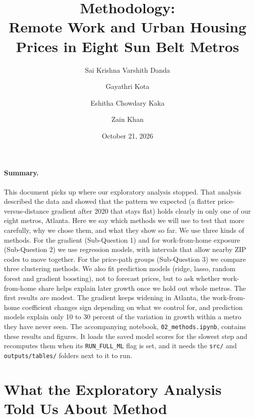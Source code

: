 \documentclass[11pt]{article}
\title{Methodology:\\ Remote Work and Urban Housing Prices in Eight Sun Belt Metros}
\author[1]{Sai Krishna Varshith Danda}
\author[1]{Gayathri Kota}
\author[1]{Eshitha Chowdary Kaka}
\author[1]{Zain Khan}
\affil[1]{Arizona State University, Tempe, AZ 85281, USA}
\date{October 21, 2026}
\begin{document}
\maketitle

\paragraph{Summary.} This document picks up where our exploratory analysis stopped. That analysis described the data and
showed that the pattern we expected (a flatter price-versus-distance gradient after 2020 that stays flat) holds clearly in only
one of our eight metros, Atlanta. Here we say which methods we will use to test that more carefully, why we chose them, and what
they show so far. We use three kinds of methods. For the gradient (Sub-Question 1) and for work-from-home exposure
(Sub-Question 2) we use regression models, with intervals that allow nearby ZIP codes to move together. For the price-path groups
(Sub-Question 3) we compare three clustering methods. We also fit prediction models (ridge, lasso, random forest and gradient
boosting), not to forecast prices, but to ask whether work-from-home share helps explain later growth once we hold out whole
metros. The first results are modest. The gradient keeps widening in Atlanta, the work-from-home coefficient changes sign
depending on what we control for, and prediction models explain only 10 to 30 percent of the variation in growth within a metro
they have never seen. The accompanying notebook, \texttt{02\_methods.ipynb}, contains these results and figures. It loads the saved model scores for the
slowest step and recomputes them when its \texttt{RUN\_FULL\_ML} flag is set, and it needs the \texttt{src/} and
\texttt{outputs/tables/} folders next to it to run.

\section{What the Exploratory Analysis Told Us About Method}
\end{document}
